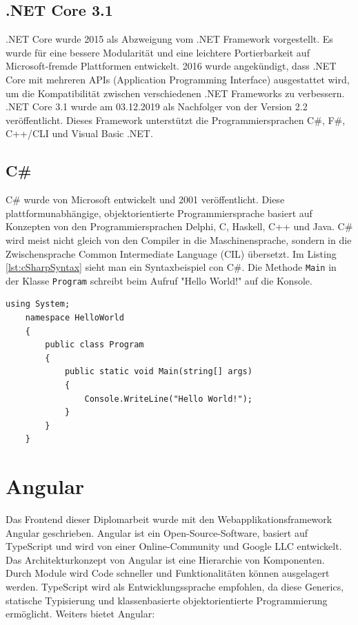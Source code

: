 \subsection{.NET Core 3.1}
.NET Core wurde 2015 als Abzweigung vom .NET Framework vorgestellt. Es wurde für eine bessere Modularität und eine leichtere Portierbarkeit auf Microsoft-fremde Plattformen entwickelt. 2016 wurde angekündigt, dass .NET Core mit mehreren APIs (Application Programming Interface) ausgestattet wird, um die Kompatibilität zwischen verschiedenen .NET Frameworks zu verbessern. \autocite{wikiDotnet} \\
.NET Core 3.1 wurde am 03.12.2019 als Nachfolger von der Version 2.2 veröffentlicht. Dieses Framework unterstützt die Programmiersprachen C\#, F\#, C++/CLI und Visual Basic .NET. \autocite{wikiDotnetCore}

\subsection{C\#}
C\# wurde von Microsoft entwickelt und 2001 veröffentlicht. Diese plattformunabhängige, objektorientierte Programmiersprache basiert auf Konzepten von den Programmiersprachen Delphi, C, Haskell, C++ und Java.
C\# wird meist nicht gleich von den Compiler in die Maschinensprache, sondern in die Zwischensprache Common Intermediate Language (CIL) übersetzt. Im Listing \ref{lst:cSharpSyntax} sieht man ein Syntaxbeispiel con C\#. Die Methode \texttt{Main} in der Klasse \texttt{Program} schreibt beim Aufruf "Hello World!" auf die Konsole. \autocite{wikiCSharp}

\begin{lstlisting}[caption={C\#-Syntaxbeispiel}, language={[Sharp]C},label={lst:cSharpSyntax}]
	using System;
	namespace HelloWorld
	{
		public class Program
		{
			public static void Main(string[] args)
			{
				Console.WriteLine("Hello World!");
			}
		}
	}
\end{lstlisting}
\section{Angular}
Das Frontend dieser Diplomarbeit wurde mit den Webapplikationsframework Angular geschrieben. Angular ist ein Open-Source-Software, basiert auf TypeScript und wird von einer Online-Community und Google LLC entwickelt.\\
Das Architekturkonzept von Angular ist eine Hierarchie von Komponenten. Durch Module wird Code schneller und Funktionalitäten können ausgelagert werden. TypeScript wird als Entwicklungssprache empfohlen, da diese Generics, statische Typisierung und klassenbasierte objektorientierte Programmierung ermöglicht. \autocite{wikiAngular}
Weiters bietet Angular:

